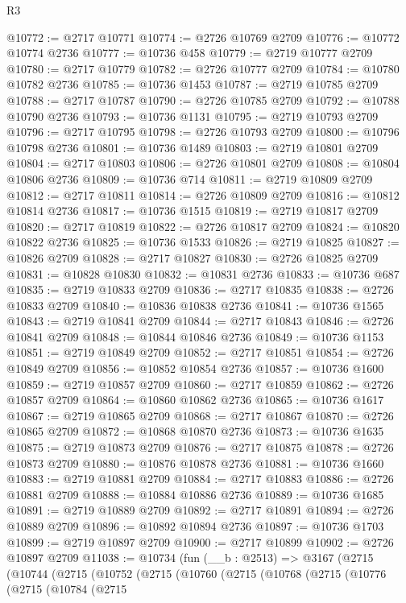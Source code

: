 \begin{lexlean}{R3}
\begin{coremodule}
@10772 := @2717 @10771
@10774 := @2726 @10769 @2709
@10776 := @10772 @10774 @2736
@10777 := @10736 @458
@10779 := @2719 @10777 @2709
@10780 := @2717 @10779
@10782 := @2726 @10777 @2709
@10784 := @10780 @10782 @2736
@10785 := @10736 @1453
@10787 := @2719 @10785 @2709
@10788 := @2717 @10787
@10790 := @2726 @10785 @2709
@10792 := @10788 @10790 @2736
@10793 := @10736 @1131
@10795 := @2719 @10793 @2709
@10796 := @2717 @10795
@10798 := @2726 @10793 @2709
@10800 := @10796 @10798 @2736
@10801 := @10736 @1489
@10803 := @2719 @10801 @2709
@10804 := @2717 @10803
@10806 := @2726 @10801 @2709
@10808 := @10804 @10806 @2736
@10809 := @10736 @714
@10811 := @2719 @10809 @2709
@10812 := @2717 @10811
@10814 := @2726 @10809 @2709
@10816 := @10812 @10814 @2736
@10817 := @10736 @1515
@10819 := @2719 @10817 @2709
@10820 := @2717 @10819
@10822 := @2726 @10817 @2709
@10824 := @10820 @10822 @2736
@10825 := @10736 @1533
@10826 := @2719 @10825
@10827 := @10826 @2709
@10828 := @2717 @10827
@10830 := @2726 @10825 @2709
@10831 := @10828 @10830
@10832 := @10831 @2736
@10833 := @10736 @687
@10835 := @2719 @10833 @2709
@10836 := @2717 @10835
@10838 := @2726 @10833 @2709
@10840 := @10836 @10838 @2736
@10841 := @10736 @1565
@10843 := @2719 @10841 @2709
@10844 := @2717 @10843
@10846 := @2726 @10841 @2709
@10848 := @10844 @10846 @2736
@10849 := @10736 @1153
@10851 := @2719 @10849 @2709
@10852 := @2717 @10851
@10854 := @2726 @10849 @2709
@10856 := @10852 @10854 @2736
@10857 := @10736 @1600
@10859 := @2719 @10857 @2709
@10860 := @2717 @10859
@10862 := @2726 @10857 @2709
@10864 := @10860 @10862 @2736
@10865 := @10736 @1617
@10867 := @2719 @10865 @2709
@10868 := @2717 @10867
@10870 := @2726 @10865 @2709
@10872 := @10868 @10870 @2736
@10873 := @10736 @1635
@10875 := @2719 @10873 @2709
@10876 := @2717 @10875
@10878 := @2726 @10873 @2709
@10880 := @10876 @10878 @2736
@10881 := @10736 @1660
@10883 := @2719 @10881 @2709
@10884 := @2717 @10883
@10886 := @2726 @10881 @2709
@10888 := @10884 @10886 @2736
@10889 := @10736 @1685
@10891 := @2719 @10889 @2709
@10892 := @2717 @10891
@10894 := @2726 @10889 @2709
@10896 := @10892 @10894 @2736
@10897 := @10736 @1703
@10899 := @2719 @10897 @2709
@10900 := @2717 @10899
@10902 := @2726 @10897 @2709
@11038 := @10734
    (fun (__b : @2513) =>
    @3167
      (@2715
        (@10744
          (@2715
            (@10752
              (@2715
                (@10760
                  (@2715
                    (@10768
                      (@2715
                        (@10776
                          (@2715
                            (@10784
                              (@2715

\end{coremodule}
\end{lexlean}
